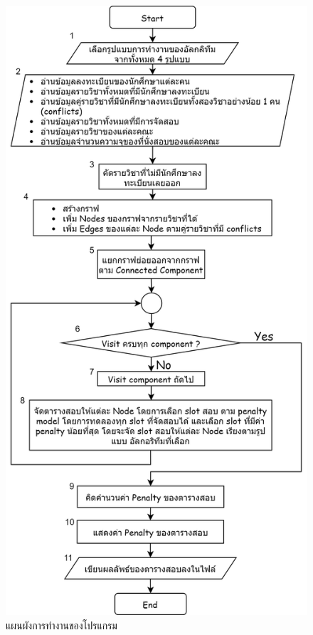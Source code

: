 \begin{figure}
  \begin{center}
    \includegraphics[]{images/exam_sched_flowchart.png}
  \end{center}
  \caption[แผนผังการทำงานของโปรแกรม]{แผนผังการทำงานของโปรแกรม}
  \label{fig:flowchart}     
\end{figure}
